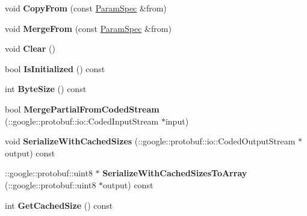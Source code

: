\begin{DoxyCompactItemize}
\item 
\mbox{\label{classcaffe_1_1_param_spec_a6d2e53c833ac70d8f001f74e60807611}} 
void {\bfseries Copy\+From} (const \mbox{\hyperlink{classcaffe_1_1_param_spec}{Param\+Spec}} \&from)
\item 
\mbox{\label{classcaffe_1_1_param_spec_ae84916032f90559ec4fa9bffad1be756}} 
void {\bfseries Merge\+From} (const \mbox{\hyperlink{classcaffe_1_1_param_spec}{Param\+Spec}} \&from)
\item 
\mbox{\label{classcaffe_1_1_param_spec_a4631ca26f5c870451131b80141ab98e4}} 
void {\bfseries Clear} ()
\item 
\mbox{\label{classcaffe_1_1_param_spec_a0f8c40f48806a954bcf380c797e02dc9}} 
bool {\bfseries Is\+Initialized} () const
\item 
\mbox{\label{classcaffe_1_1_param_spec_a0534277702bba1fd6c57d71858978b2e}} 
int {\bfseries Byte\+Size} () const
\item 
\mbox{\label{classcaffe_1_1_param_spec_acb2733af5d69c437a45577adfd64cad0}} 
bool {\bfseries Merge\+Partial\+From\+Coded\+Stream} (\+::google\+::protobuf\+::io\+::\+Coded\+Input\+Stream $\ast$input)
\item 
\mbox{\label{classcaffe_1_1_param_spec_af5e28a1112b6f3c35d85920f6ef3b2f4}} 
void {\bfseries Serialize\+With\+Cached\+Sizes} (\+::google\+::protobuf\+::io\+::\+Coded\+Output\+Stream $\ast$output) const
\item 
\mbox{\label{classcaffe_1_1_param_spec_ae836e89ac365b5fd1ee390f46b806765}} 
\+::google\+::protobuf\+::uint8 $\ast$ {\bfseries Serialize\+With\+Cached\+Sizes\+To\+Array} (\+::google\+::protobuf\+::uint8 $\ast$output) const
\item 
\mbox{\label{classcaffe_1_1_param_spec_a4de2ccc3181df794c67082ee074ac9d6}} 
int {\bfseries Get\+Cached\+Size} () const
\item 
\mbox{\label{classcaffe_1_1_param_spec_a84ffee213c12e797f49d289284693b26}} 

\end{DoxyCompactItemize}
